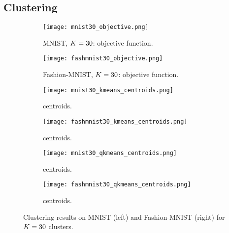 
\subsection{Clustering}

\begin{figure*}[h]
\begin{subfigure}[b]{.49\textwidth}
\texttt{[image: mnist30\_objective.png]}
\caption{MNIST, $K=30$: objective function.}
\label{fig:mnist:objfun}
\end{subfigure}
\begin{subfigure}[b]{.49\textwidth}
\texttt{[image: fashmnist30\_objective.png]}
\caption{Fashion-MNIST, $K=30$: objective function.}
\label{fig:fmnist:objfun}
\end{subfigure}
\begin{subfigure}[t]{.49\textwidth}
\texttt{[image: mnist30\_kmeans\_centroids.png]}
\caption{\kmeans centroids.}
\label{fig:mnist:kmeans:centroids}
\end{subfigure}
\begin{subfigure}[t]{.49\textwidth}
\texttt{[image: fashmnist30\_kmeans\_centroids.png]}
\caption{\kmeans centroids.}
\label{fig:fmnist:kmeans:centroids}
\end{subfigure}
\begin{subfigure}[t]{.49\textwidth}
\texttt{[image: mnist30\_qkmeans\_centroids.png]}
\caption{\qkmeans centroids.}
\label{fig:mnist:qkmeans:centroids}
\end{subfigure}
\begin{subfigure}[t]{.49\textwidth}
\texttt{[image: fashmnist30\_qkmeans\_centroids.png]}
\caption{\qkmeans centroids.}
\label{fig:fmnist:qkmeans:centroids}
\end{subfigure}
\caption{Clustering results on MNIST (left) and Fashion-MNIST (right) for $K=30$ clusters.}
\label{fig:clustering:realdata}
\end{figure*}

